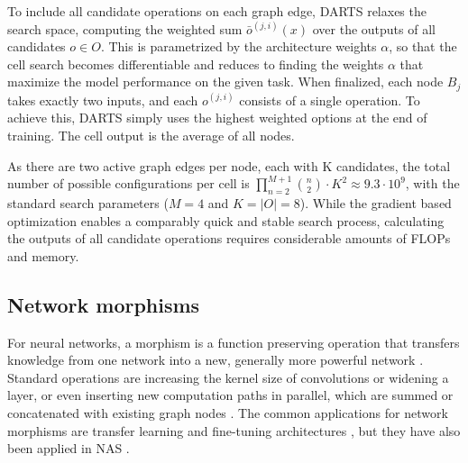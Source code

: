 \documentclass[conference]{IEEEtran}
\begin{document}
\vspace*{0pt}
To include all candidate operations on each graph edge, DARTS relaxes the search space, computing the weighted sum $\bar{o}^{(j, i)}(x)$ over the outputs of all candidates $o \in O$. This is parametrized by the architecture weights $\alpha$, so that the cell search becomes differentiable and reduces to finding the weights $\alpha$ that maximize the model performance on the given task.
When finalized, each node $B_j$ takes exactly two inputs, and each $o^{(j, i)}$ consists of a single operation. To achieve this, DARTS simply uses the highest weighted options at the end of training.
The cell output is the average of all nodes.

As there are two active graph edges per node, each with K candidates, 
the total number of possible configurations per cell is $\prod_{n=2}^{M+1} {n \choose 2} \cdot K^2 \approx 9.3 \cdot 10^{9}$, 
with the standard search parameters ($M=4$ and $K = \vert O \vert =8$). While the gradient based optimization enables a comparably quick and stable search process, calculating the outputs of all candidate operations requires considerable amounts of FLOPs and memory.










\subsection{Network morphisms}
\label{ss_rel_morphisms}

For neural networks, a morphism is a function preserving operation that transfers knowledge from one network into a new, generally more powerful network \cite{morph, morph_net2net}.
Standard operations are increasing the kernel size of convolutions or widening a layer, or even inserting new computation paths in parallel, which are summed or concatenated with existing graph nodes \cite{morph_pathlevel}.
The common applications for network morphisms are transfer learning \cite{morph_net2net} and fine-tuning architectures \cite{morph}, but they have also been applied in NAS \cite{morph_nas, morph_pathlevel}.









\end{document}
